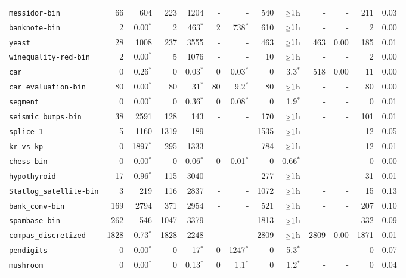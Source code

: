 \begin{tabular}{lrrrrrrrrrrrr}
\texttt{messidor-bin} & 66 & 604 & 223 & 1204 & - & - & 540 & $\mathsmaller{\geq}1$h & - & - & 211 & 0.03\\
\texttt{banknote-bin} & 2 & 0.00$^*$ & 2 & 463$^*$ & 2 & 738$^*$ & 610 & $\mathsmaller{\geq}1$h & - & - & 2 & 0.00\\
\texttt{yeast} & 28 & 1008 & 237 & 3555 & - & - & 463 & $\mathsmaller{\geq}1$h & 463 & 0.00 & 185 & 0.01\\
\texttt{winequality-red-bin} & 2 & 0.00$^*$ & 5 & 1076 & - & - & 10 & $\mathsmaller{\geq}1$h & - & - & 2 & 0.00\\
\texttt{car} & 0 & 0.26$^*$ & 0 & 0.03$^*$ & 0 & 0.03$^*$ & 0 & 3.3$^*$ & 518 & 0.00 & 11 & 0.00\\
\texttt{car\_evaluation-bin} & 80 & 0.00$^*$ & 80 & 31$^*$ & 80 & 9.2$^*$ & 80 & $\mathsmaller{\geq}1$h & - & - & 80 & 0.00\\
\texttt{segment} & 0 & 0.00$^*$ & 0 & 0.36$^*$ & 0 & 0.08$^*$ & 0 & 1.9$^*$ & - & - & 0 & 0.01\\
\texttt{seismic\_bumps-bin} & 38 & 2591 & 128 & 143 & - & - & 170 & $\mathsmaller{\geq}1$h & - & - & 101 & 0.01\\
\texttt{splice-1} & 5 & 1160 & 1319 & 189 & - & - & 1535 & $\mathsmaller{\geq}1$h & - & - & 12 & 0.05\\
\texttt{kr-vs-kp} & 0 & 1897$^*$ & 295 & 1333 & - & - & 784 & $\mathsmaller{\geq}1$h & - & - & 12 & 0.01\\
\texttt{chess-bin} & 0 & 0.00$^*$ & 0 & 0.06$^*$ & 0 & 0.01$^*$ & 0 & 0.66$^*$ & - & - & 0 & 0.00\\
\texttt{hypothyroid} & 17 & 0.96$^*$ & 115 & 3040 & - & - & 277 & $\mathsmaller{\geq}1$h & - & - & 31 & 0.01\\
\texttt{Statlog\_satellite-bin} & 3 & 219 & 116 & 2837 & - & - & 1072 & $\mathsmaller{\geq}1$h & - & - & 15 & 0.13\\
\texttt{bank\_conv-bin} & 169 & 2794 & 371 & 2954 & - & - & 521 & $\mathsmaller{\geq}1$h & - & - & 207 & 0.10\\
\texttt{spambase-bin} & 262 & 546 & 1047 & 3379 & - & - & 1813 & $\mathsmaller{\geq}1$h & - & - & 332 & 0.09\\
\texttt{compas\_discretized} & 1828 & 0.73$^*$ & 1828 & 2248 & - & - & 2809 & $\mathsmaller{\geq}1$h & 2809 & 0.00 & 1871 & 0.01\\
\texttt{pendigits} & 0 & 0.00$^*$ & 0 & 17$^*$ & 0 & 1247$^*$ & 0 & 5.3$^*$ & - & - & 0 & 0.07\\
\texttt{mushroom} & 0 & 0.00$^*$ & 0 & 0.13$^*$ & 0 & 1.1$^*$ & 0 & 1.2$^*$ & - & - & 0 & 0.04\\

\end{tabular}
